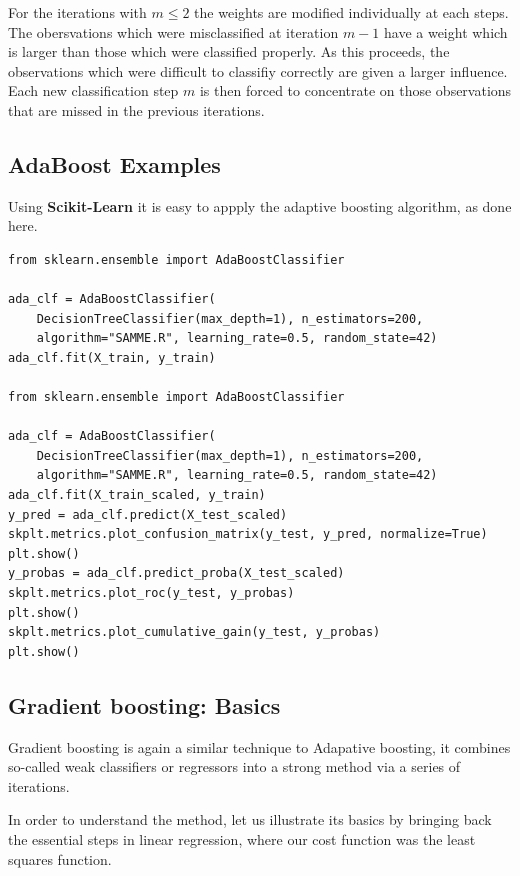 \documentclass[%
oneside,                 %
final,                   %
10pt]{article}
\begin{document}
\noindent
For the iterations with $m \le 2$ the weights are modified
individually at each steps. The obersvations which were misclassified
at iteration $m-1$ have a weight which is larger than those which were
classified properly. As this proceeds, the observations which were
difficult to classifiy correctly are given a larger influence. Each
new classification step $m$ is then forced to concentrate on those
observations that are missed in the previous iterations.



\subsection*{AdaBoost Examples}

Using \textbf{Scikit-Learn} it is easy to appply the adaptive boosting algorithm, as done here.

\begin{verbatim}
from sklearn.ensemble import AdaBoostClassifier

ada_clf = AdaBoostClassifier(
    DecisionTreeClassifier(max_depth=1), n_estimators=200,
    algorithm="SAMME.R", learning_rate=0.5, random_state=42)
ada_clf.fit(X_train, y_train)

from sklearn.ensemble import AdaBoostClassifier

ada_clf = AdaBoostClassifier(
    DecisionTreeClassifier(max_depth=1), n_estimators=200,
    algorithm="SAMME.R", learning_rate=0.5, random_state=42)
ada_clf.fit(X_train_scaled, y_train)
y_pred = ada_clf.predict(X_test_scaled)
skplt.metrics.plot_confusion_matrix(y_test, y_pred, normalize=True)
plt.show()
y_probas = ada_clf.predict_proba(X_test_scaled)
skplt.metrics.plot_roc(y_test, y_probas)
plt.show()
skplt.metrics.plot_cumulative_gain(y_test, y_probas)
plt.show()
\end{verbatim}


\subsection*{Gradient boosting: Basics}

Gradient boosting is again a similar technique to Adapative boosting,
it combines so-called weak classifiers or regressors into a strong
method via a series of iterations.

In order to understand the method, let us illustrate its basics by
bringing back the essential steps in linear regression, where our cost
function was the least squares function.
\end{document}
